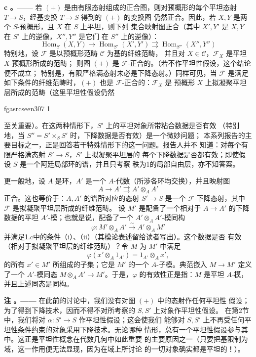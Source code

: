 \documentclass[12pt,twoside,openany]{book}
\numberwithin{equation}{section}
\newcommand{\fgaunitid}{unbound}
\newcommand{\src}[1]{%
  \phantomsection
  \hypertarget{src:\fgaunitid:#1}{}%
  \hypertarget{fga.\fgaunitid.p#1}{}%
  \ifcsname fgasrcseen#1\endcsname\else
    \expandafter\gdef\csname fgasrcseen#1\endcsname{1}%
    \hypertarget{src:#1}{}%
  \fi
  \marginpar{\raggedleft\footnotesize\sffamily #1}%
}
\theoremstyle{plain}
\theoremstyle{definition}
\theoremstyle{remark}
\newcommand{\result}[2]{%
  \par\medskip\noindent\textbf{#1%
  \if\relax\detokenize{#2}\relax\else\space#2\fi。——}\enspace
}
\begin{document}
\result{c}{} 若 $(+)$ 是由有限态射组成的正合图，则对预概形的每个平坦态射
$T\longrightarrow S$，经基变换 $T\longrightarrow S$ 得到的 $(+)$ 的变换图
仍然正合。因此，若 $X,Y$ 是两个 $S$-预概形，且 $X$ 在 $S$ 上平坦，则下列
集合映射图正合（其中 $X',Y'$ 是 $X,Y$ 在 $S'$ 上的逆像，$X'',Y''$ 是它们
在 $S''$ 上的逆像）：
\[
  \operatorname{Hom}_S(X,Y)\longrightarrow
  \operatorname{Hom}_{S'}(X',Y')
  \rightrightarrows
  \operatorname{Hom}_{S''}(X'',Y'')
\]
特别地，设 $\mathcal F$ 是以预概形范畴 $\mathcal C$ 为基的纤维范畴，
并且对 $X\in\mathcal C$，$\mathcal F_X$ 是平坦 $X$-预概形所成的范畴；
则图 $(+)$ 是 $\mathcal F$-正合的。（若不作平坦性假设，这个结论便不成立；
特别是，有限严格满态射未必是下降态射。）同样可见，当 $\mathcal F$ 是满足
如下条件的纤维范畴时，$(+)$ 也是 $\mathcal F$-正合的：$\mathcal F_X$ 是
预概形 $X$ 上拟凝聚平坦层所成的范畴（这里平坦性假设仍然

\src{307}
至关重要）。在这两种情形下，$S'$ 上的平坦对象所带粘合数据是否有效
（特别地，当 $S''=S'\times_SS'$ 时，下降数据是否有效）是一个微妙问题；
本系列报告的主要目标之一，正是回答若干特殊情形下的这一问题。报告人并不
知道：对每个有限严格满态射 $S'\longrightarrow S$，$S'$ 上拟凝聚平坦层的
每个下降数据是否都有效；即使假设 $S$ 是一个阿廷局部环的谱，并且只考察
秩为1的局部自由层，亦不知答案。

更一般地，设 $A$ 是环，$A'$ 是一个 $A$-代数（所涉各环均交换），并且映射图
\[
  A\longrightarrow A'\rightrightarrows A'\otimes_AA'
\]
正合。这也等价于：$A,A'$ 的谱所对应的态射 $S'\longrightarrow S$ 是一个
$\mathcal F$-下降态射，其中 $\mathcal F$ 是拟凝聚平坦层所成的纤维范畴。
设 $M'$ 是配备了一个相对于 $A\longrightarrow A'$ 的下降数据的平坦
$A'$-模；也就是说，配备了一个
$A'\otimes_AA'$-模同构
\[
  \varphi:M'\otimes_AA'\xrightarrow{\sim}A'\otimes_AM'
\]
并满足1.c中的条件（i）、（ii）（其模论表述留给读者写出）。这个数据是否
有效（相对于拟凝聚平坦层的纤维范畴）？令 $M$ 为 $M'$ 中满足
\[
  \varphi(x'\otimes_A1_{A'})=1_{A'}\otimes_Ax',
\]
的所有 $x'\in M'$ 所组成的子集；它是 $M'$ 的一个 $A$-子模。典范嵌入
$M\longrightarrow M'$ 定义了一个 $A'$-模同态
$M\otimes_AA'\longrightarrow M'$。于是，$\varphi$ 的有效性正是指：$M$
是平坦 $A$-模，并且上述同态是同构。

\result{注}{} 在此前的讨论中，我们没有对图 $(+)$ 中的态射作任何平坦性
假设；为了得到下降技术，因而不得不对所考察的 $S,S'$ 上对象作平坦性假设。
在第2节中，我们将对 $\alpha:S'\longrightarrow S$ 作平坦性假设；这会使我们
能够对 $S,S'$ 上不再受任何平坦性条件约束的对象采用下降技术。无论哪种
情形，总有一个平坦性假设参与其中。这正是平坦性概念在代数几何中如此重要
的主要原因之一（只要把基限制为域，这一作用便无法显现，因为在域上所讨论
的一切对象确实都是平坦的！）。
\end{document}

